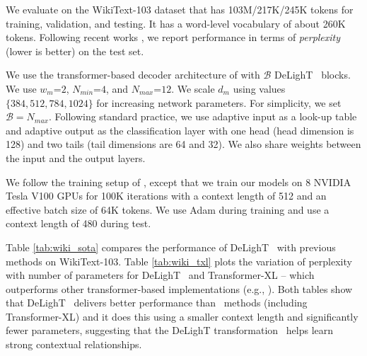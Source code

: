  We evaluate on the WikiText-103 dataset \citep{merity2017pointer} that has 103M/217K/245K tokens for training, validation, and testing. It has a word-level vocabulary of about 260K tokens. Following recent works \citep{baevski2018adaptive,dai2019transformer}, we report performance in terms of \textit{perplexity} (lower is better) on the test set.

 We use the transformer-based decoder architecture of \citet{baevski2018adaptive} with $\mathcal{B}$ DeLighT ~blocks. We use $w_m$=$2$, $N_{min}$=$4$, and $N_{max}$=$12$. We scale $d_m$ using values $\{384, 512, 784, 1024\}$ for increasing network parameters. For simplicity, we set $\mathcal{B}=N_{max}$. Following standard practice, we use adaptive input \citep{baevski2018adaptive} as a look-up table and adaptive output \citep{grave2017efficient} as the classification layer with one head (head dimension is 128) and two tails (tail dimensions are 64 and 32). We also share weights between the input and the output layers.

\vspace{0.5mm}
 We follow the training setup of \citet{baevski2018adaptive}, except that we train our models on 8 NVIDIA Tesla V100 GPUs for 100K iterations with a context length of 512 and an effective batch size of 64K tokens. We use Adam during training and use a context length of 480 during test.

 Table \ref{tab:wiki_sota} compares the performance of DeLighT ~with previous methods on WikiText-103. Table \ref{tab:wiki_txl} plots the variation of perplexity with number of parameters for DeLighT ~and Transformer-XL \citep{dai2019transformer} -- which outperforms other transformer-based implementations (e.g., \citealt{baevski2018adaptive}). Both tables show that DeLighT ~delivers better performance than \sota~methods (including Transformer-XL) and it does this using a smaller context length and significantly fewer parameters, suggesting that the DeLighT transformation ~helps learn strong contextual relationships.


